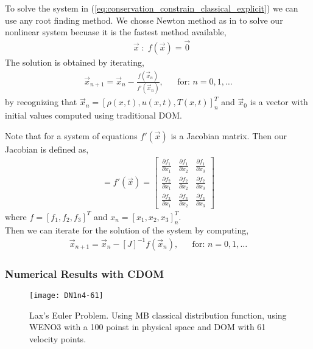 \begin{frame}
	To solve the system in (\ref{eq:conservation_constrain_classical_explicit}) we can use any root finding method. We chosse Newton method as in \cite{Huang2011261} to solve our nonlinear system becuase it is the fastest method available,
	\begin{align*}
			& \vec{x} \; : \; f(\vec{x}) = \vec{0}
	\end{align*}
	The solution is obtained by iterating,
	\begin{align*}
			& \vec{x}_{n+1} = \vec{x}_{n}-\frac{f(\vec{x}_n)}{f'(\vec{x}_n)},& &\text{for: }n=0,1,\dots&
	\end{align*}
	by recognizing that $\vec{x}_n = [\rho(x,t),u(x,t),T(x,t)]_n^T$ and $\vec{x}_0$ is a vector with initial values computed using traditional DOM.
\end{frame}

\begin{frame}
	Note that for a system of equations $f'(\vec{x})$ is a Jacobian matrix.
	Then our Jacobian is defined as,
	\begin{align*}
		 [J] = f'(\vec{x}) = 
		\begin{bmatrix}
			\frac{\partial f_1}{\partial x_1} & \frac{\partial f_1}{\partial x_2} & \frac{\partial f_1}{\partial x_3} \\[0.3em]
			\frac{\partial f_2}{\partial x_1} & \frac{\partial f_2}{\partial x_2} & \frac{\partial f_2}{\partial x_3} \\[0.3em]
			\frac{\partial f_3}{\partial x_1} & \frac{\partial f_3}{\partial x_2} & \frac{\partial f_3}{\partial x_3} 
		\end{bmatrix}
	\end{align*}
	where $f = [f_1,f_2,f_3]^T$ and $x_n = [x_1,x_2,x_3]_n^T$. \\
	Then we can iterate for the solution of the system by computing,
	\begin{align*}
		& \vec{x}_{n+1} = \vec{x}_{n} - [J]^{-1} f(\vec{x}_n) ,& &\text{for: }n=0,1,\dots&
	\end{align*}
	
\end{frame}



\begin{frame}
	\frametitle{Numerical Results with CDOM}
		
		\begin{figure}
			\centering
				\texttt{[image: DN1n4-61]}
			\caption{Lax's Euler Problem. Using MB classical distribution function, using WENO3 with a 100 poinst in physical space and DOM with 61 velocity points.}
			\label{fig:DN1n4-61}
		\end{figure}
		
\end{frame}

